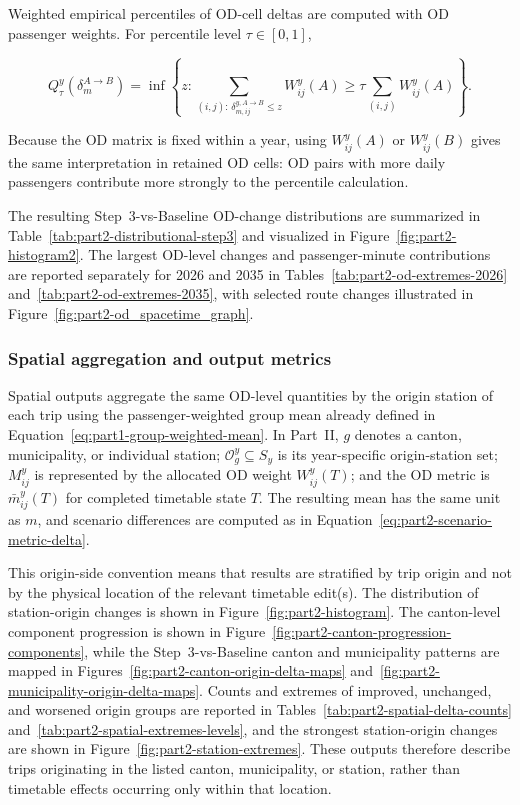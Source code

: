 \documentclass[preprint,12pt]{elsarticle}
\begin{document}
Weighted empirical percentiles of OD-cell deltas are computed with OD passenger weights. For percentile level \(\tau\in[0,1]\),

\begin{equation}
Q_\tau^y(\delta_m^{A\to B})
=
\inf
\left\{
z:
\sum_{(i,j):\,\delta_{m,ij}^{y,A\to B}\le z}
W_{ij}^y(A)
\ge
\tau
\sum_{(i,j)}
W_{ij}^y(A)
\right\}.
\label{eq:part2-weighted-quantile}
\end{equation}

Because the OD matrix is fixed within a year, using \(W_{ij}^y(A)\) or \(W_{ij}^y(B)\) gives the same interpretation in retained OD cells: OD pairs with more daily passengers contribute more strongly to the percentile calculation.

The resulting Step~3-vs-Baseline OD-change distributions are summarized in Table~\ref{tab:part2-distributional-step3} and visualized in Figure~\ref{fig:part2-histogram2}. The largest OD-level changes and passenger-minute contributions are reported separately for 2026 and 2035 in Tables~\ref{tab:part2-od-extremes-2026} and~\ref{tab:part2-od-extremes-2035}, with selected route changes illustrated in Figure~\ref{fig:part2-od_spacetime_graph}.


\subsubsection{Spatial aggregation and output metrics}\label{sec:methods-part2-spatial-outputs}

Spatial outputs aggregate the same OD-level quantities by the origin station of each trip using the passenger-weighted group mean already defined in Equation~\eqref{eq:part1-group-weighted-mean}. In Part~II, \(g\) denotes a canton, municipality, or individual station; \(\mathcal{O}_g^y\subseteq S_y\) is its year-specific origin-station set; \(M^y_{ij}\) is represented by the allocated OD weight \(W_{ij}^y(T)\); and the OD metric is \(\bar m_{ij}^y(T)\) for completed timetable state \(T\). The resulting mean has the same unit as \(m\), and scenario differences are computed as in Equation~\eqref{eq:part2-scenario-metric-delta}.


This origin-side convention means that results are stratified by trip origin and not by the physical location of the relevant timetable edit(s). The distribution of station-origin changes is shown in Figure~\ref{fig:part2-histogram}. The canton-level component progression is shown in Figure~\ref{fig:part2-canton-progression-components}, while the Step~3-vs-Baseline canton and municipality patterns are mapped in Figures~\ref{fig:part2-canton-origin-delta-maps} and~\ref{fig:part2-municipality-origin-delta-maps}. Counts and extremes of improved, unchanged, and worsened origin groups are reported in Tables~\ref{tab:part2-spatial-delta-counts} and~\ref{tab:part2-spatial-extremes-levels}, and the strongest station-origin changes are shown in Figure~\ref{fig:part2-station-extremes}. These outputs therefore describe trips originating in the listed canton, municipality, or station, rather than timetable effects occurring only within that location.
\clearpage
\end{document}
